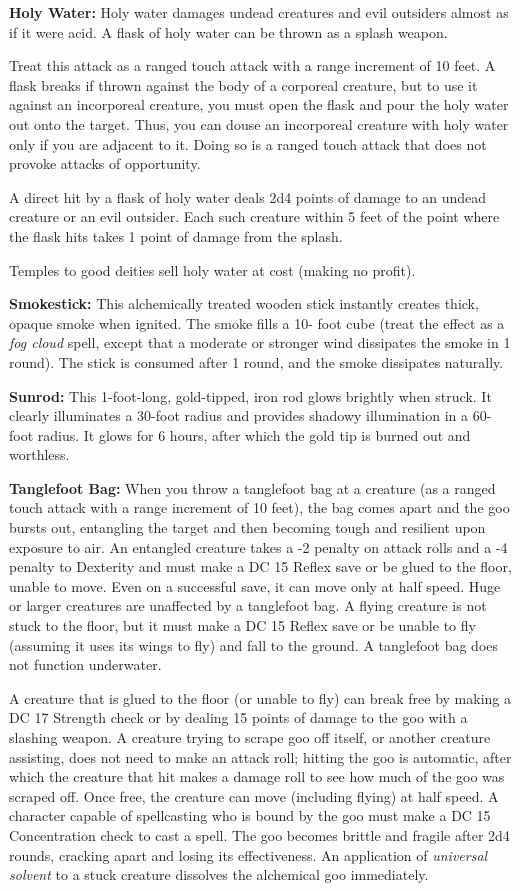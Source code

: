 \documentclass{article}
\begin{document}
\textbf{Holy Water:} Holy water damages undead creatures and evil outsiders almost 
as if it were acid. A flask of holy water can be thrown as a splash weapon.

Treat this attack as a ranged touch attack with a range increment of 10 feet. A 
flask breaks if thrown against the body of a corporeal creature, but to use it 
against an incorporeal creature, you must open the flask and pour the holy water 
out onto the target. Thus, you can douse an incorporeal creature with holy water 
only if you are adjacent to it. Doing so is a ranged touch attack that does not 
provoke attacks of opportunity.

A direct hit by a flask of holy water deals 2d4 points of damage to an undead creature 
or an evil outsider. Each such creature within 5 feet of the point where the flask 
hits takes 1 point of damage from the splash.

Temples to good deities sell holy water at cost (making no profit).

\textbf{Smokestick:} This alchemically treated wooden stick instantly creates thick, 
opaque smoke when ignited. The smoke fills a 10- foot cube (treat the effect as 
a \textit{fog cloud }spell, except that a moderate or stronger wind dissipates 
the smoke in 1 round). The stick is consumed after 1 round, and the smoke dissipates 
naturally.

\textbf{Sunrod:} This 1-foot-long, gold-tipped, iron rod glows brightly when struck. 
It clearly illuminates a 30-foot radius and provides shadowy illumination in a 
60-foot radius. It glows for 6 hours, after which the gold tip is burned out and 
worthless.

\textbf{Tanglefoot Bag:} When you throw a tanglefoot bag at a creature (as a ranged 
touch attack with a range increment of 10 feet), the bag comes apart and the goo 
bursts out, entangling the target and then becoming tough and resilient upon exposure 
to air. An entangled creature takes a -2 penalty on attack rolls and a -4 penalty 
to Dexterity and must make a DC 15 Reflex save or be glued to the floor, unable 
to move. Even on a successful save, it can move only at half speed. Huge or larger 
creatures are unaffected by a tanglefoot bag. A flying creature is not stuck to 
the floor, but it must make a DC 15 Reflex save or be unable to fly (assuming it 
uses its wings to fly) and fall to the ground. A tanglefoot bag does not function 
underwater.

A creature that is glued to the floor (or unable to fly) can break free by making 
a DC 17 Strength check or by dealing 15 points of damage to the goo with a slashing 
weapon. A creature trying to scrape goo off itself, or another creature assisting, 
does not need to make an attack roll; hitting the goo is automatic, after which 
the creature that hit makes a damage roll to see how much of the goo was scraped 
off. Once free, the creature can move (including flying) at half speed. A character 
capable of spellcasting who is bound by the goo must make a DC 15 Concentration 
check to cast a spell. The goo becomes brittle and fragile after 2d4 rounds, cracking 
apart and losing its effectiveness. An application of \textit{universal solvent} 
to a stuck creature dissolves the alchemical goo immediately.
\end{document}
